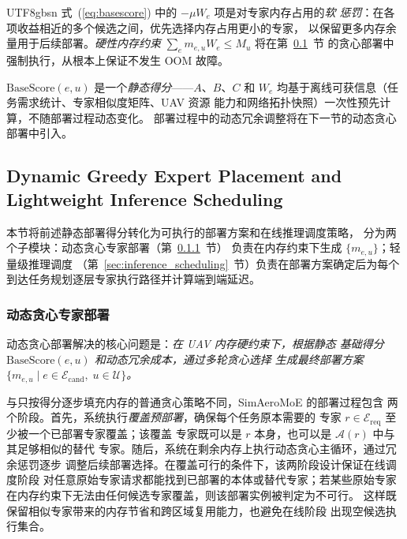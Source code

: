 \documentclass[conference]{IEEEtran}
\begin{document}
\begin{CJK*}{UTF8}{gbsn}
式~(\ref{eq:basescore}) 中的 $-\mu W_e$ 项是对专家内存占用的\emph{软
惩罚}：在各项收益相近的多个候选之间，优先选择内存占用更小的专家，
以保留更多内存余量用于后续部署。\emph{硬性内存约束}
$\sum_e m_{e,u}W_e \le M_u$ 将在第~\ref{sec:greedy_scheduling}~节
的贪心部署中强制执行，从根本上保证不发生 OOM 故障。

$\mathrm{BaseScore}(e,u)$ 是一个\emph{静态得分}——$A$、$B$、$C$ 和
$W_e$ 均基于离线可获信息（任务需求统计、专家相似度矩阵、UAV 资源
能力和网络拓扑快照）一次性预先计算，不随部署过程动态变化。
部署过程中的动态冗余调整将在下一节的动态贪心部署中引入。

\subsection{Dynamic Greedy Expert Placement and Lightweight Inference Scheduling}
\label{sec:greedy_scheduling}

本节将前述静态部署得分转化为可执行的部署方案和在线推理调度策略，
分为两个子模块：动态贪心专家部署（第~\ref{sec:greedy_placement}~节）
负责在内存约束下生成 $\{m_{e,u}\}$；轻量级推理调度
（第~\ref{sec:inference_scheduling}~节）负责在部署方案确定后为每个
到达任务规划逐层专家执行路径并计算端到端延迟。

\subsubsection{动态贪心专家部署}
\label{sec:greedy_placement}

动态贪心部署解决的核心问题是：\emph{在 UAV 内存硬约束下，根据静态
基础得分 $\mathrm{BaseScore}(e,u)$ 和动态冗余成本，通过多轮贪心选择
生成最终部署方案 $\{m_{e,u}\mid e\in\mathcal{E}_{\mathrm{cand}},\;
u\in\mathcal{U}\}$。}

与只按得分逐步填充内存的普通贪心策略不同，SimAeroMoE 的部署过程包含
两个阶段。首先，系统执行\emph{覆盖预部署}，确保每个任务原本需要的
专家 $r\in\mathcal{E}_{\mathrm{req}}$ 至少被一个已部署专家覆盖；该覆盖
专家既可以是 $r$ 本身，也可以是 $\mathcal{A}(r)$ 中与其足够相似的替代
专家。随后，系统在剩余内存上执行动态贪心主循环，通过冗余惩罚逐步
调整后续部署选择。在覆盖可行的条件下，该两阶段设计保证在线调度阶段
对任意原始专家请求都能找到已部署的本体或替代专家；若某些原始专家
在内存约束下无法由任何候选专家覆盖，则该部署实例被判定为不可行。
这样既保留相似专家带来的内存节省和跨区域复用能力，也避免在线阶段
出现空候选执行集合。


\end{CJK*}
\end{document}
